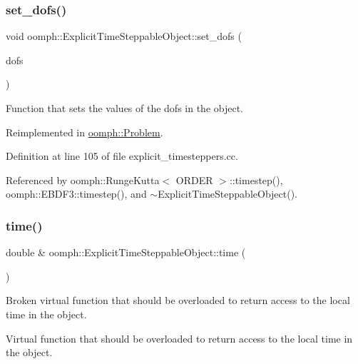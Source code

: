 \subsubsection{\texorpdfstring{set\+\_\+dofs()}{set\_dofs()}}
{\footnotesize\ttfamily void oomph\+::\+Explicit\+Time\+Steppable\+Object\+::set\+\_\+dofs (\begin{DoxyParamCaption}\item[{const \hyperlink{classoomph_1_1DoubleVector}{Double\+Vector} \&}]{dofs }\end{DoxyParamCaption})\hspace{0.3cm}{\ttfamily [virtual]}}



Function that sets the values of the dofs in the object. 



Reimplemented in \hyperlink{classoomph_1_1Problem_ab51480d18550c107c9f13629102f6b08}{oomph\+::\+Problem}.



Definition at line 105 of file explicit\+\_\+timesteppers.\+cc.



Referenced by oomph\+::\+Runge\+Kutta$<$ O\+R\+D\+E\+R $>$\+::timestep(), oomph\+::\+E\+B\+D\+F3\+::timestep(), and $\sim$\+Explicit\+Time\+Steppable\+Object().

\mbox{\label{classoomph_1_1ExplicitTimeSteppableObject_a42fde674301963f01b8e41b3f333cc65}} 
\subsubsection{\texorpdfstring{time()}{time()}}
{\footnotesize\ttfamily double \& oomph\+::\+Explicit\+Time\+Steppable\+Object\+::time (\begin{DoxyParamCaption}{ }\end{DoxyParamCaption})\hspace{0.3cm}{\ttfamily [virtual]}}



Broken virtual function that should be overloaded to return access to the local time in the object. 

Virtual function that should be overloaded to return access to the local time in the object. 


